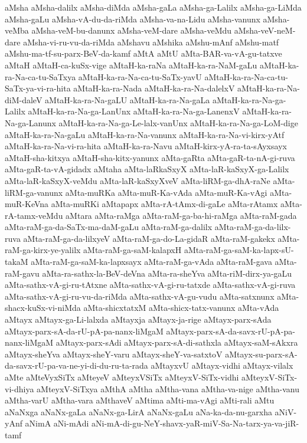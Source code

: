 {aMsha
aMsha-dalilx
aMsha-diMda
aMsha-gaLa
aMsha-ga-Lalilx
aMsha-ga-LiMda
aMsha-gaLu
aMsha-vA-du-da-riMda
aMsha-va-na-Lidu
aMsha-vanunx
aMsha-veMba
aMsha-veM-bu-danunx
aMsha-veM-dare
aMsha-veMdu
aMsha-veV-neM-dare
aMsha-vi-ru-vu-da-riMda
aMshavu
aMshika
aMshu-mAnf
aMshu-matf
aMshu-ma-tf-su-parx-BeV-da-kamf
aMtA
aMtU
aMta-BAR-va-vA-gu-tatxve
aMtaH
aMtaH-ca-kuSx-vige
aMtaH-ka-raNa
aMtaH-ka-ra-NaM-gaLu
aMtaH-ka-ra-Na-ca-tu-SaTxya
aMtaH-ka-ra-Na-ca-tu-SaTx-yavU
aMtaH-ka-ra-Na-ca-tu-SaTx-ya-vi-ra-hita
aMtaH-ka-ra-Nada
aMtaH-ka-ra-Na-dalelxV
aMtaH-ka-ra-Na-diM-daleV
aMtaH-ka-ra-Na-gaLU
aMtaH-ka-ra-Na-gaLa
aMtaH-ka-ra-Na-ga-Lalilx
aMtaH-ka-ra-Na-ga-LanUnx
aMtaH-ka-ra-Na-ga-LanenxV
aMtaH-ka-ra-Na-ga-Lanunx
aMtaH-ka-ra-Na-ga-Le-lalx-vanUnx
aMtaH-ka-ra-Na-ga-LoM-dige
aMtaH-ka-ra-Na-gaLu
aMtaH-ka-ra-Na-vanunx
aMtaH-ka-ra-Na-vi-kirx-yAtf
aMtaH-ka-ra-Na-vi-ra-hita
aMtaH-ka-ra-Navu
aMtaH-kirx-yA-ra-ta-sAyxsayx
aMtaH-sha-kitxya
aMtaH-sha-kitx-yanunx
aMta-gaRta
aMta-gaR-ta-nA-gi-ruva
aMta-gaR-ta-vA-gidadx
aMtaha
aMta-laRkaSxyX
aMta-laR-kaSxyX-ga-Lalilx
aMta-laR-kaSxyX-veMdu
aMta-laR-kaSxyXveV
aMta-liRM-ga-dhA-raNe
aMta-liRM-ga-vanunx
aMta-muRKa
aMta-muR-Ka-vAda
aMta-muR-Ka-vAgi
aMta-muR-KeVna
aMta-muRKi
aMtapapx
aMta-rA-tAmx-di-gaLe
aMta-rAtamx
aMta-rA-tamx-veMdu
aMtara
aMta-raMga
aMta-raM-ga-ba-hi-raMga
aMta-raM-gada
aMta-raM-ga-da-SaTx-ma-daM-gaLu
aMta-raM-ga-dalilx
aMta-raM-ga-da-lilx-ruva
aMta-raM-ga-da-lilxyeV
aMta-raM-ga-do-La-gidaR
aMta-raM-gakekx
aMta-raM-ga-kirx-ye-yalilx
aMta-raM-ga-saM-kalapxH
aMta-raM-ga-saM-ka-lapx-sU-takaM
aMta-raM-ga-saM-ka-lapxsayx
aMta-raM-ga-vAda
aMta-raM-gava
aMta-raM-gavu
aMta-ra-sathx-la-BeV-deVna
aMta-ra-sheYva
aMta-riM-dirx-ya-gaLu
aMta-sathx-vA-gi-ru-tAtxne
aMta-sathx-vA-gi-ru-tatxde
aMta-sathx-vA-gi-ruva
aMta-sathx-vA-gi-ru-vu-da-riMda
aMta-sathx-vA-gu-vudu
aMta-satxnunx
aMta-shacx-kuSx-vi-niMda
aMta-shicxtatxM
aMta-shicx-tatx-vanunx
aMta-vAda
aMtayx
aMtayx-ga-Li-lalxda
aMtayxja
aMtayx-ja-rige
aMtayx-parx-sAda
aMtayx-parx-sA-da-rU-pA-pa-nanx-liMgaM
aMtayx-parx-sA-da-savx-rU-pA-pa-nanx-liMgaM
aMtayx-parx-sAdi
aMtayx-parx-sA-di-sathxla
aMtayx-saM-sAkxra
aMtayx-sheYva
aMtayx-sheY-varu
aMtayx-sheY-va-satxtoV
aMtayx-su-parx-sA-da-savx-rU-pa-va-ne-yi-di-du-ru-ta-rada
aMtayxvU
aMtayx-vidhi
aMtayx-vilalx
aMte
aMteVyxSiTx
aMteyeV
aMteyxVSiTx
aMteyxV-SiTx-vidhi
aMteyxV-SiTx-vi-dhiya
aMteyxV-SiTxya
aMthA
aMtha
aMtha-vana
aMtha-va-nige
aMtha-vanu
aMtha-varU
aMtha-vara
aMthaveV
aMtima
aMti-ma-vAgi
aMti-rali
aMtu
aNaNxga
aNaNx-gaLa
aNaNx-ga-LirA
aNaNx-gaLu
aNa-ka-da-nu-garxha
aNiV-yAnf
aNimA
aNi-mAdi
aNi-mA-di-gu-NeY-shavx-yaR-miV-Sa-Na-tarx-ya-va-jiR-tamf
}
